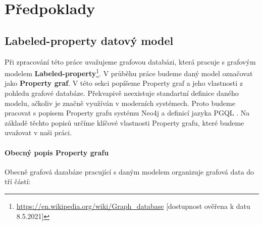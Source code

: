 \chapter{Předpoklady}
\label{requirements}

\section{Labeled-property datový model}
\label{req.propGraph}

Při zpracování této práce uvažujeme grafovou databázi, která pracuje s grafovým modelem \textbf{Labeled-property}\footnote{\url{https://en.wikipedia.org/wiki/Graph_database} [dostupnost ověřena k datu 8.5.2021]}.
V průběhu práce budeme daný model označovat jako \textbf{Property graf}.
V této sekci popíšeme Property graf a jeho vlastnosti z pohledu grafové databáze.
Překvapivě neexistuje standartní definice daného modelu, ačkoliv je značně využíván v moderních systémech.
Proto budeme pracovat s popisem Property grafu systému Neo4j \citep{neopropertygraph} a definicí jazyka PGQL \citep{pgql}.
Na základě těchto popisů určíme klíčové vlastnosti Property grafu, které budeme uvažovat v naši práci.

\subsubsection{Obecný popis Property grafu}
Obecně grafová dazabáze pracující s daným modelem organizuje grafová data do tří částí:

